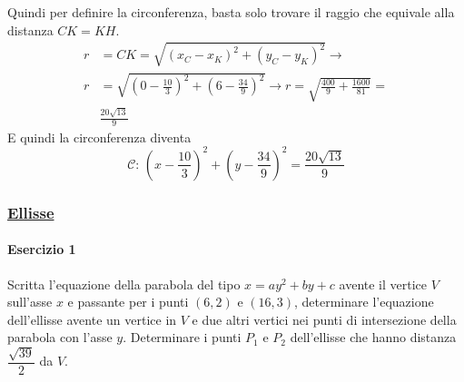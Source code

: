 Quindi per definire la circonferenza, basta solo trovare il raggio che equivale alla distanza $CK=KH$.
\begin{align*}
r &= CK = \sqrt{(x_C-x_K)^2+(y_C-y_K)^2} \rightarrow \\
r &= \sqrt{\left(0-\frac{10}{3}\right)^2+\left(6-\frac{34}{9}\right)^2} \rightarrow
r = \sqrt{\frac{400}{9}+\frac{1600}{81}} = \\&\frac{20\sqrt{13}}{9}
\end{align*}
E quindi la circonferenza diventa
\begin{equation*}
\boxed{
	\mathscr{C}:\,\left(x-\frac{10}{3}\right)^2+\left(y-\frac{34}{9}\right)^2=\frac{20\sqrt{13}}{9}
}
\end{equation*}

\subsubsection*{\hyperref[subsec:geomanal:ellisse]{Ellisse}}\label{ex:ellisse}
\paragraph{Esercizio 1}
Scritta l'equazione della parabola del tipo $x=ay^2+by+c$ avente il vertice $V$ sull'asse $x$ e 
passante per i punti $(6,2)$ e $(16,3)$, determinare l'equazione dell'ellisse avente un vertice in
$V$ e due altri vertici nei punti di intersezione della parabola con l'asse $y$. Determinare i punti
$P_1$ e $P_2$ dell'ellisse che hanno distanza $\dfrac{\sqrt{39}}{2}$ da $V$.
\divisor

